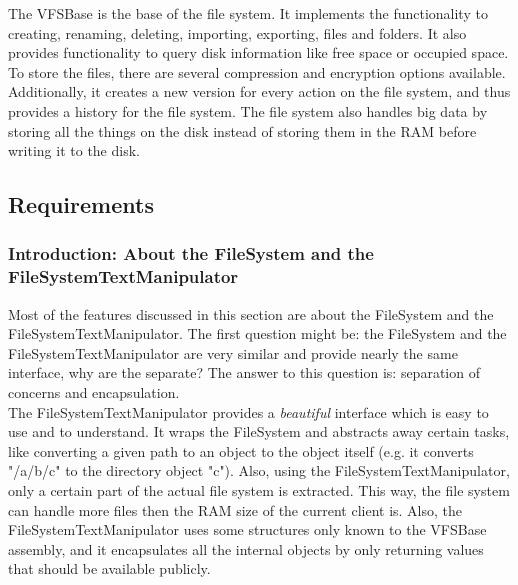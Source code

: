 \documentclass[JCDReport.tex]{subfiles}
\begin{document}
The VFSBase is the base of the file system. It implements the functionality to creating, renaming, deleting, importing, exporting, files and folders. It also provides functionality to query disk information like free space or occupied space. To store the files, there are several compression and encryption options available. Additionally, it creates a new version for every action on the file system, and thus provides a history for the file system. The file system also handles big data by storing all the things on the disk instead of storing them in the RAM before writing it to the disk.

\subsection{Requirements}



\subsubsection{Introduction: About the FileSystem and the FileSystemTextManipulator}
Most of the features discussed in this section are about the FileSystem and the FileSystemTextManipulator. The first question might be: the FileSystem and the FileSystemTextManipulator are very similar and provide nearly the same interface, why are the separate? The answer to this question is: separation of concerns and encapsulation.\\
The FileSystemTextManipulator provides a \textit{beautiful} interface which is easy to use and to understand. It wraps the FileSystem and abstracts away certain tasks, like converting a given path to an object to the object itself (e.g. it converts "/a/b/c" to the directory object "c"). Also, using the FileSystemTextManipulator, only a certain part of the actual file system is extracted. This way, the file system can handle more files then the RAM size of the current client is. Also, the FileSystemTextManipulator uses some structures only known to the VFSBase assembly, and it encapsulates all the internal objects by only returning values that should be available publicly.\\
\end{document}
